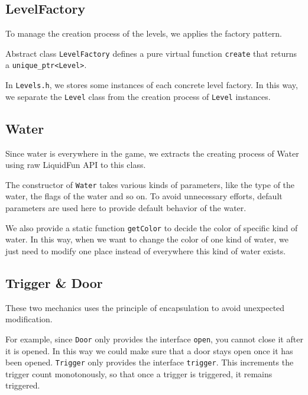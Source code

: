 \documentclass{article}
\begin{document}
\subsection{LevelFactory}
To manage the creation process of the levels, we applies the factory pattern.

Abstract class \verb|LevelFactory| defines a pure virtual function \verb|create| that returns a \verb|unique_ptr<Level>|.

In \verb|Levels.h|, we stores some instances of each concrete level factory.
In this way, we separate the \verb|Level| class from the creation process of \verb|Level| instances.

\subsection{Water}
Since water is everywhere in the game, we extracts the creating process of Water using raw LiquidFun API to this class.

The constructor of \verb|Water| takes various kinds of parameters, like the type of the water, the flags of the water and so on.
To avoid unnecessary efforts, default parameters are used here to provide default behavior of the water.

We also provide a static function \verb|getColor| to decide the color of specific kind of water.
In this way, when we want to change the color of one kind of water, we just need to modify one place instead of everywhere this kind of water exists.

\subsection{Trigger \& Door}
These two mechanics uses the principle of encapsulation to avoid unexpected modification.

For example, since \verb|Door| only provides the interface \verb|open|, you cannot close it after it is opened. In this way we could make sure that a door stays open once it has been opened.
\verb|Trigger| only provides the interface \verb|trigger|. This increments the trigger count monotonously, so that once a trigger is triggered, it remains triggered.
\end{document}
